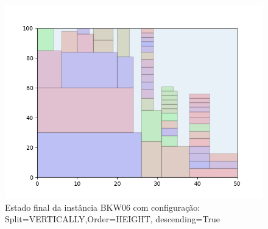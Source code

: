 \begin{figure}[H]
    \centering
    \caption[]{Estado final da instância BKW06 com configuração: Split=VERTICALLY,Order=HEIGHT, descending=True}
    \label{fig:bkw06-vertically-height-true}
    \includegraphics[scale=0.5]{output/figures/bkw/bkw06/vertically/height/true/00}
\end{figure}